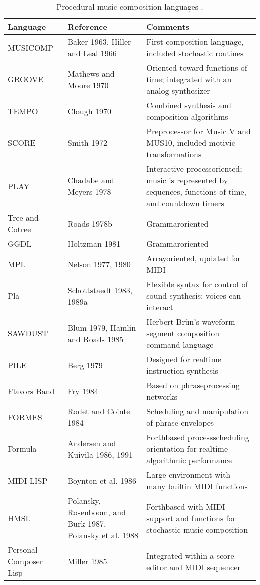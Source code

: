 \begin{table}[htbp]
	\label{tab:procedural}
	\caption{Procedural music composition languages \cite[815-817]{Roads1995}.}
	\centering
	\vspace{12pt}
	\begin{tabular}{ *{3}{l} }
		\hline
		Language & Reference & Comments \\
		\hline
		MUSICOMP & Baker 1963, Hiller and Leal 1966 & First composition language, included stochastic routines \\
		GROOVE & Mathews and Moore 1970 & Oriented toward functions of time; integrated with an analog synthesizer \\
		TEMPO & Clough 1970 & Combined synthesis and composition algorithms \\
		SCORE & Smith 1972 & Preprocessor for Music V and MUS10, included motivic transformations \\
		PLAY & Chadabe and Meyers 1978 & Interactive process­oriented; music is represented by sequences, functions of time, and countdown timers \\
		Tree and Cotree & Roads 1978b & Grammar­oriented \\
		GGDL & Holtzman 1981 & Grammar­oriented \\
		MPL & Nelson 1977, 1980 & Array­oriented, updated for MIDI \\
		Pla & Schottstaedt 1983, 1989a & Flexible syntax for control of sound synthesis; voices can interact \\
		SAWDUST & Blum 1979, Hamlin and Roads 1985 & Herbert Brün's waveform segment composition command language \\
		PILE & Berg 1979 & Designed for real­time instruction synthesis \\
		Flavors Band & Fry 1984 & Based on phrase­processing networks \\
		FORMES & Rodet and Cointe 1984 & Scheduling and manipulation of phrase envelopes \\
		Formula & Andersen and Kuivila 1986, 1991 & Forth­based process­scheduling orientation for real­time algorithmic performance \\
		MIDI­-LISP & Boynton et al. 1986 & Large environment with many built­in MIDI functions \\
		HMSL & Polansky, Rosenboom, and Burk 1987, Polansky et al. 1988 & Forth­based with MIDI support and functions for stochastic music composition \\
		Personal Composer Lisp & Miller 1985 & Integrated within a score editor and MIDI sequencer \\

\end{tabular}
\end{table}
